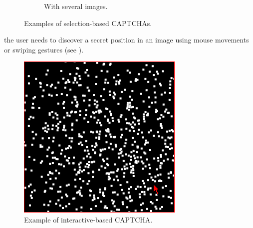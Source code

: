 \begin{itemize}
{\begin{figure}[h]
\begin{subfigure}[b]{0.48\textwidth}
         \caption{\footnotesize{With several images.}}
        \label{soa:selection2}
     \end{subfigure}
     \caption{\footnotesize{Examples of selection-based CAPTCHAs.}}
\end{figure}
}
{the user needs to discover a secret position in an image using mouse movements or swiping gestures (see ).
\begin{figure}[h]
     \centering
     \includegraphics[width=.4\linewidth]{Images/StateOfArt/interactive_CAPTCHA}
     \caption{\footnotesize{Example of interactive-based CAPTCHA.}}\label{soa:interactive_CAPTCHA}
\end{figure}
}
\end{itemize}

